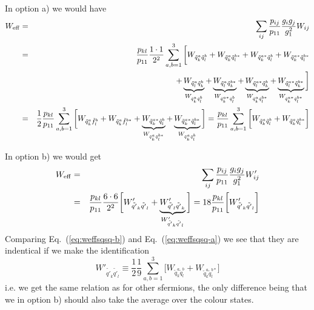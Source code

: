 In option a) we would have 
\begin{eqnarray}
    W_{\rm eff} & = & \sum_{ij}\frac{p_{ij}}{p_{11}} 
    \frac{g_{i}g_{j}}{g_{1}^2} W_{ij}
    \nonumber \\
    & = & \frac{p_{kl}}{p_{11}} \frac{1 \cdot 1}{2^2}
    \sum_{a,b=1}^3 \bigg[ 
    W_{\tilde{q}_{k}^a \tilde{q}_{l}^b} +
    W_{\tilde{q}_{k}^a \tilde{q}_{l}^{b*}} +
    W_{\tilde{q}_{k}^{a*} \tilde{q}_{l}^b} +
    W_{\tilde{q}_{k}^{a*} \tilde{q}_{l}^{b*}} \nonumber \\
    & & +
    \underbrace{W_{\tilde{q}_{l}^a \tilde{q}_{k}^b}}_
       {W_{\tilde{q}_{k}^a \tilde{q}_{l}^b}} +
    \underbrace{W_{\tilde{q}_{l}^a \tilde{q}_{k}^{b*}}}_
       {W_{\tilde{q}_{k}^{a*} \tilde{q}_{l}^b}} +
    \underbrace{W_{\tilde{q}_{l}^{a*} \tilde{q}_{k}^b}}_
       {W_{\tilde{q}_{k}^a \tilde{q}_{l}^{b*}}} +
    \underbrace{W_{\tilde{q}_{l}^{a*} \tilde{q}_{k}^{b*}}}_
       {W_{\tilde{q}_{k}^{a*} \tilde{q}_{l}^{b*}}}
    \bigg]  \nonumber \\
    & = &
    \frac{1}{2} \frac{p_{kl}}{p_{11}}
    \sum_{a,b=1}^3 \bigg[ 
    W_{\tilde{q}_{k}^a \tilde{f}_{l}^b} +
    W_{\tilde{q}_{k}^a \tilde{f}_{l}^{b*}} +
    \underbrace{W_{\tilde{q}_{k}^{a*} \tilde{q}_{l}^b}}_
        {W_{\tilde{q}_{k}^a \tilde{q}_{l}^{b*}}} +
    \underbrace{W_{\tilde{q}_{k}^{a*} \tilde{q}_{l}^{b*}}}_
        {W_{\tilde{q}_{k}^a \tilde{q}_{l}^b}}
    \bigg] 
    = \frac{p_{kl}}{p_{11}}
    \sum_{a,b=1}^3 \bigg[ 
    W_{\tilde{q}_{k}^a \tilde{q}_{l}^b} +
    W_{\tilde{q}_{k}^a \tilde{q}_{l}^{b*}}
    \bigg] \label{eq:weffsqsq-a}
\end{eqnarray}    

In option b) we would get 
\begin{eqnarray}
    W_{\rm eff} & = & \sum_{ij}\frac{p_{ij}}{p_{11}} 
    \frac{g_{i}g_{j}}{g_{1}^2} W'_{ij}
    \nonumber \\
    & = & \frac{p_{kl}}{p_{11}} \frac{6 \cdot 6}{2^2}
    \bigg[ 
    W'_{\tilde{q'}_{k} \tilde{q'}_{l}} +
    \underbrace{W'_{\tilde{q'}_{l} \tilde{q'}_{k}}}_
       {W'_{\tilde{q'}_{k} \tilde{q'}_{l}}} \bigg]
    = 18 \frac{p_{kl}}{p_{11}} \bigg[
    W'_{\tilde{q'}_{k} \tilde{q'}_{l}}\bigg]
    \label{eq:weffsqsq-b}
\end{eqnarray}
Comparing Eq.~(\ref{eq:weffsqsq-b}) and Eq.~(\ref{eq:weffsqsq-a}) we 
see that they are indentical if we make the identification
\begin{equation}
    W'_{\tilde{q'}_{k} \tilde{q'}_{l}} \equiv 
    \frac{1}{2} \frac{1}{9}\sum_{a,b=1}^3 \bigg[
    W_{\tilde{q}_{k}^a \tilde{q}_{l}^b} + 
    W_{\tilde{q}_{k}^a \tilde{q}_{l}^{b*}} \bigg] 
\end{equation}
i.e. we get the same relation as for other sfermions, the only difference being that
we in option b) should also take the average over the colour states. 

